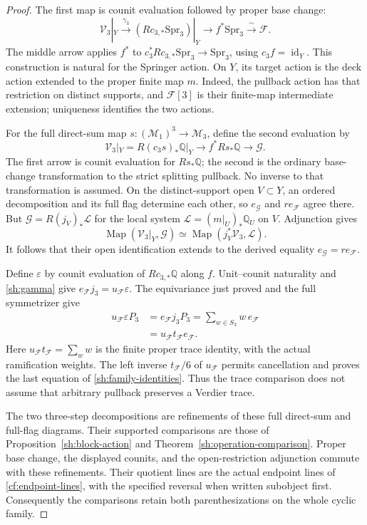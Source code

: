 \begin{proof}
The first map is counit evaluation followed by proper base change:
\[
 \mathcal V_3|_Y
 \xrightarrow{\ \gamma_3\ }
 (Rc_{3,*}\mathrm{Spr}_3)|_Y
 \longrightarrow f^*\mathrm{Spr}_3
 \xrightarrow{\ \sim\ }\mathcal F.
\]
The middle arrow applies $f^*$ to
$c_3^*Rc_{3,*}\mathrm{Spr}_3\to\mathrm{Spr}_3$, using
$c_3f=\operatorname{id}_Y$. This construction is natural for
the Springer action. On $Y$, its target action is the deck
action extended to the proper finite map $m$. Indeed, the
pullback action has that restriction on distinct supports, and
$\mathcal F[3]$ is their finite-map intermediate extension;
uniqueness identifies the two actions.

For the full direct-sum map
$s:(\mathcal M_1)^3\to\mathcal M_3$, define the second
evaluation by
\[
 \mathcal V_3|_Y=R(c_3s)_*\mathbb Q|_Y
 \longrightarrow f^*Rs_*\mathbb Q
 \longrightarrow\mathcal G.
\]
The first arrow is counit evaluation for $Rs_*\mathbb Q$;
the second is the ordinary base-change transformation to the
strict splitting pullback. No inverse to that transformation
is assumed. On the distinct-support open $V\subset Y$, an
ordered decomposition and its full flag determine each other,
so $e_{\mathcal G}$ and $r e_{\mathcal F}$ agree there.
But $\mathcal G=R(j_V)_*\mathcal L$ for the local system
$\mathcal L=(m|_U)_*\mathbb Q_U$ on $V$. Adjunction gives
\[
 \operatorname{Map}(\mathcal V_3|_Y,\mathcal G)
 \simeq
 \operatorname{Map}(j_V^*\mathcal V_3,\mathcal L).
\]
It follows that their open identification extends to the
derived equality $e_{\mathcal G}=r e_{\mathcal F}$.

Define $\varepsilon$ by counit evaluation of
$Rc_{3,*}\mathbb Q$ along $f$.
Unit--counit naturality and \eqref{sh:gamma} give
$e_{\mathcal F}j_3=u_{\mathcal F}\varepsilon$.
The equivariance just proved and the full symmetrizer give
\[
 \begin{aligned}
 u_{\mathcal F}\varepsilon P_3
  &=e_{\mathcal F}j_3P_3
    =\sum_{w\in S_3}w\,e_{\mathcal F}\\
  &=u_{\mathcal F}t_{\mathcal F}e_{\mathcal F}.
 \end{aligned}
\]
Here $u_{\mathcal F}t_{\mathcal F}=\sum_w w$ is the finite
proper trace identity, with the actual ramification weights.
The left inverse $t_{\mathcal F}/6$ of $u_{\mathcal F}$ permits
cancellation and proves the last equation of
\eqref{sh:family-identities}. Thus the trace comparison does
not assume that arbitrary pullback preserves a Verdier trace.

The two three-step decompositions are refinements of these full
direct-sum and full-flag diagrams. Their supported comparisons
are those of Proposition~\ref{sh:block-action} and
Theorem~\ref{sh:operation-comparison}. Proper base change,
the displayed counits, and the open-restriction adjunction
commute with these refinements. Their quotient lines are the
actual endpoint lines of \eqref{cf:endpoint-lines}, with the
specified reversal when written subobject first.
Consequently the comparisons retain both parenthesizations on
the whole cyclic family.
\end{proof}

